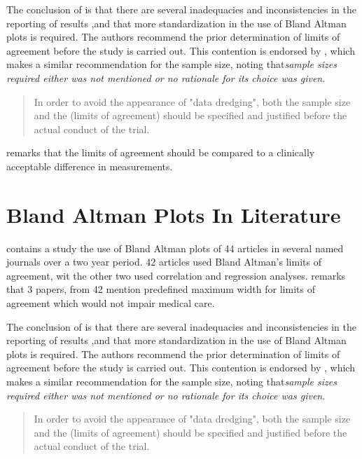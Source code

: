\documentclass[12pt, a4paper]{report}
\theoremstyle{plain}
\theoremstyle{definition}
\theoremstyle{remark}
\begin{document}
	The conclusion of \citet{mantha} is that there are several
	inadequacies and inconsistencies in the reporting of results ,and
	that more standardization in the use of Bland Altman plots is
	required. The authors recommend the prior determination of limits
	of agreement before the study is carried out. This contention is
	endorsed by \citet{lin}, which makes a similar recommendation for
	the sample size, noting that\emph{sample sizes required either was
		not mentioned or no rationale for its choice was given}.
	
	\begin{quote}
		In order to avoid the appearance of "data dredging", both the
		sample size and the (limits of agreement) should be specified and
		justified before the actual conduct of the trial. \citep{lin}
	\end{quote}
	
	\citet{Dewitte} remarks that the limits of agreement should be
	compared to a clinically acceptable difference in measurements.
	

	\section{Bland Altman Plots In Literature}
	\citet{mantha} contains a study the use of Bland Altman plots of
	44 articles in several named journals over a two year period. 42
	articles used Bland Altman's limits of agreement, wit the other
	two used correlation and regression analyses. \citet{mantha}
	remarks that 3 papers, from 42 mention predefined maximum width
	for limits of agreement which would not impair medical care.
	
	The conclusion of \citet{mantha} is that there are several
	inadequacies and inconsistencies in the reporting of results ,and
	that more standardization in the use of Bland Altman plots is
	required. The authors recommend the prior determination of limits
	of agreement before the study is carried out. This contention is
	endorsed by \citet{lin}, which makes a similar recommendation for
	the sample size, noting that\emph{sample sizes required either was
		not mentioned or no rationale for its choice was given}.
	
	\begin{quote}
		In order to avoid the appearance of "data dredging", both the
		sample size and the (limits of agreement) should be specified and
		justified before the actual conduct of the trial. \citep{lin}
	\end{quote}
	
\end{document}
